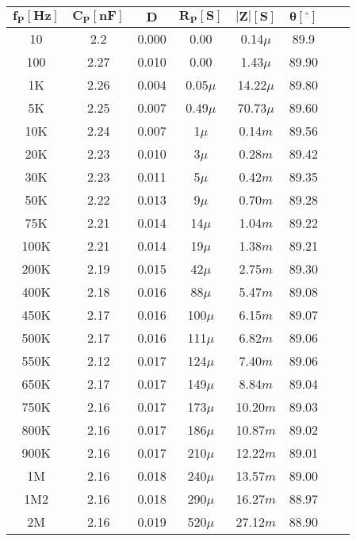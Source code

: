  \begin{center}
     \begin{table}[H]
     \centering
     \renewcommand{\arraystretch}{1.1}
         \begin{tabular}{ c c c c c c c c }
            \hline 
             $\bm{f_P[Hz]}$ &  $\bm{C_P[nF]}$ & $\bm{D}$& $\bm{R_P[S]}$ & $\bm{|Z|[S]}$ & $\bm{\theta}[^\circ]$ \\

             \hline
             10   & 2.2  & 0.000 & 0.00       & 0.14$\mu$   & 89.9  \\
			100  & 2.27 & 0.010 & 0.00       & 1.43$\mu$   & 89.90 \\
			1K   & 2.26 & 0.004 & 0.05$\mu$   & 14.22$\mu$  & 89.80 \\
			5K   & 2.25 & 0.007 & 0.49$\mu$   & 70.73$\mu$  & 89.60 \\
			10K  & 2.24 & 0.007 & 1$\mu$ & 0.14$m$ & 89.56 \\
			20K  & 2.23 & 0.010 & 3$\mu$ & 0.28$m$ & 89.42 \\
			30K  & 2.23 & 0.011 & 5$\mu$  & 0.42$m$    & 89.35 \\
			50K  & 2.22 & 0.013 & 9$\mu$  & 0.70$m$  & 89.28 \\
			75K  & 2.21 & 0.014 & 14$\mu$  & 1.04$m$   & 89.22 \\
			100K & 2.21 & 0.014 & 19$\mu$   & 1.38$m$   & 89.21 \\
			200K & 2.19 & 0.015 & 42$\mu$   & 2.75$m$  & 89.30 \\
			400K & 2.18 & 0.016 & 88$\mu$   & 5.47$m$   & 89.08 \\
			450K & 2.17 & 0.016 & 100$\mu$    & 6.15$m$  & 89.07 \\
			500K & 2.17 & 0.016 & 111$\mu$   & 6.82$m$  & 89.06 \\
			550K & 2.12 & 0.017 & 124$\mu$   & 7.40$m$    & 89.06 \\
			650K & 2.17 & 0.017 & 149$\mu$   & 8.84$m$   & 89.04 \\
			750K & 2.16 & 0.017 & 173$\mu$   & 10.20$m$   & 89.03 \\
			800K & 2.16 & 0.017 & 186$\mu$   & 10.87$m$  & 89.02 \\
			900K & 2.16 & 0.017 & 210$\mu$    & 12.22$m$  & 89.01 \\
			1M   & 2.16 & 0.018 & 240$\mu$    & 13.57$m$  & 89.00 \\
			1M2  & 2.16 & 0.018 & 290$\mu$    & 16.27$m$  & 88.97 \\
			2M   & 2.16 & 0.019 & 520$\mu$    & 27.12$m$ & 88.90 \\

\end{tabular}
\end{table}
\end{center}

